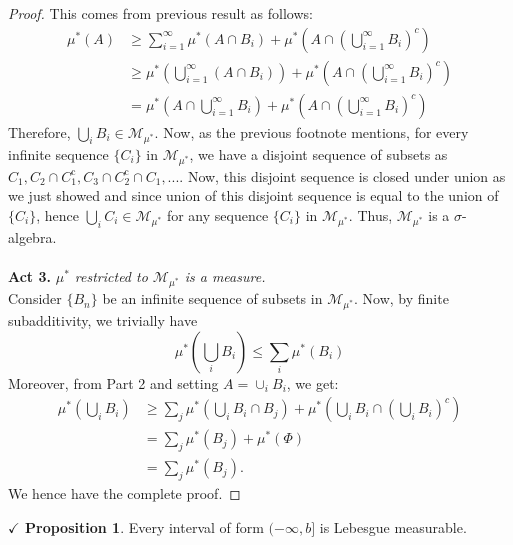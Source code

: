 \documentclass{article}
\theoremstyle{definition}
\theoremstyle{remark}
\theoremstyle{definition}
\theoremstyle{definition}
\newtheorem{proposition}{$\checkmark$ Proposition}
\theoremstyle{definition}
\newcommand{\union}{\cup}
\newcommand{\intrs}{\cap}
\newcommand{\bunion}{\bigcup}
\newcommand{\comp}[1]{#1^{\text{c}}}
\newcommand{\om}[1]{\mu^*\left ( #1\right )}
\newcommand{\set}[1]{\mathscr{#1}}
\newcommand{\msigm}[1]{\set{M}_{#1}}
\begin{document}
\begin{proof}
This comes from previous result as follows:
\begin{equation}
	\begin{split}
		\om{A} &\ge \sum_{i=1}^\infty \om{A\intrs B_i} + \om{A\intrs \left (\bunion_{i=1}^\infty B_i\right )^c}\\
		&\ge \om{\bunion_{i=1}^\infty (A\intrs B_i)} + \om{A\intrs \left (\bunion_{i=1}^\infty B_i\right )^c} \\
		&= \om{A\intrs \bunion_{i=1}^\infty B_i} + \om{A\intrs \left (\bunion_{i=1}^\infty B_i\right )^c}
	\end{split}
\end{equation}
Therefore, $ \bunion_i B_i  \in  \msigm{\mu^*}$. Now, as the previous footnote mentions, for every infinite sequence $ \{C_i\} $ in $ \msigm{\mu^*} $, we have a disjoint sequence of subsets as $ C_1,C_2\intrs \comp{C_1} , C_3\intrs \comp{C_2} \intrs C_1, ... $. Now, this disjoint sequence is closed under union as we just showed and since union of this disjoint sequence is equal to the union of $ \{C_i\} $, hence $ \bunion_i C_i \in \msigm{\mu^*} $ for any sequence $ \{C_i\} $ in $ \msigm{\mu^*} $. Thus, $ \msigm{\mu^*} $ is a $ \sigma $-algebra.\\\\
\textbf{Act 3.}\emph{ $ \mu^* $ restricted to $ \msigm{\mu^*} $ is a measure.}\\
Consider $ \{B_n\} $ be an infinite sequence of subsets in $ \msigm{\mu^*} $. Now, by finite subadditivity, we trivially have
\[\om{\bunion_i B_i} \le \sum_i \om{B_i}\]
Moreover, from Part 2 and setting $ A = \union_i B_i $, we get:
\begin{equation*}
	\begin{split}
		\om{\bunion_i B_i} &\ge \sum_j\om{\bunion_i B_i \intrs B_j} + \om{\bunion_i B_i \intrs \left (\bunion_i B_i\right )^c}\\
		&= \sum_j \om{B_j} + \om{\Phi}\\
		&= \sum_j \om{B_j}. 
	\end{split}
\end{equation*}
We hence have the complete proof.
\end{proof}
\hrulefill
\newpage
\begin{proposition}\label{P-11}
	Every interval of form $ (-\infty, b] $ is Lebesgue measurable.
\end{proposition}
\end{document}
